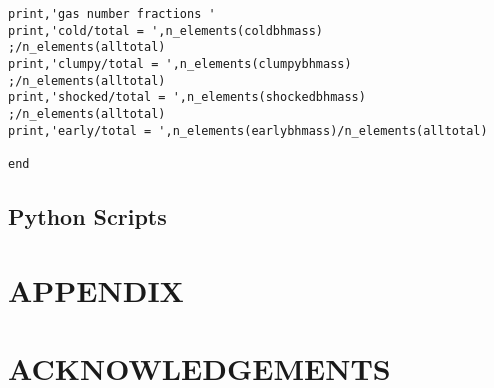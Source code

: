 \documentclass[12pt,headA,chapB]{fiskthesis}
\begin{document}
\begin{verbatim}
print,'gas number fractions '
print,'cold/total = ',n_elements(coldbhmass)
;/n_elements(alltotal)
print,'clumpy/total = ',n_elements(clumpybhmass)
;/n_elements(alltotal)
print,'shocked/total = ',n_elements(shockedbhmass)
;/n_elements(alltotal)
print,'early/total = ',n_elements(earlybhmass)/n_elements(alltotal)

end
\end{verbatim}

\section{Python Scripts}


\thispagestyle{empty}

\chapter{APPENDIX}
\thispagestyle{empty}

\chapter*{ACKNOWLEDGEMENTS}
\thispagestyle{empty}

\renewcommand{\thepage}{}\renewcommand{\thepage}{}

\end{document}
